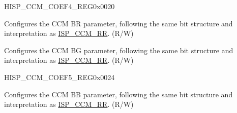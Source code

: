 \begin{register}{H}{ISP\_CCM\_COEF4\_REG}{0x0020}\label{regdesc:ISPCCMCOEF4REG}
%
%
%
\regnewline%
\begin{regdesc}\begin{reglist}
\label{fielddesc:ISPCCMBR}\item [ISP\_CCM\_BR] Configures the CCM BR parameter, following the same bit structure and interpretation as \hyperref[fielddesc:ISPCCMRR]{ISP\_CCM\_RR}. (R/W)
\label{fielddesc:ISPCCMBG}\item [ISP\_CCM\_BG] Configures the CCM BG parameter, following the same bit structure and interpretation as \hyperref[fielddesc:ISPCCMRR]{ISP\_CCM\_RR}. (R/W)
\end{reglist}\end{regdesc}
\end{register}


\begin{register}{H}{ISP\_CCM\_COEF5\_REG}{0x0024}\label{regdesc:ISPCCMCOEF5REG}
%
%
\regnewline%
\begin{regdesc}\begin{reglist}
\label{fielddesc:ISPCCMBB}\item [ISP\_CCM\_BB] Configures the CCM BB parameter, following the same bit structure and interpretation as \hyperref[fielddesc:ISPCCMRR]{ISP\_CCM\_RR}. (R/W)
\end{reglist}\end{regdesc}
\end{register}


